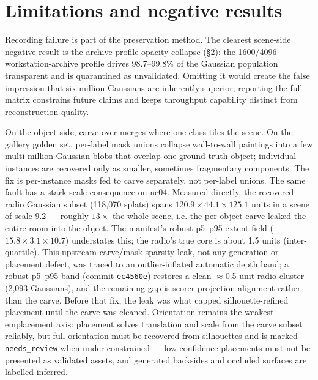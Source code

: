 \section{Limitations and negative results}

Recording failure is part of the preservation method. The clearest scene-side negative result is the
archive-profile opacity collapse (\S2): the 1600/4096 workstation-archive profile drives 98.7--99.8\%
of the Gaussian population transparent and is quarantined as unvalidated. Omitting it would create the
false impression that six million Gaussians are inherently superior; reporting the full matrix
constrains future claims and keeps throughput capability distinct from reconstruction quality.

On the object side, carve over-merges where one class tiles the scene. On the gallery golden set,
per-label mask unions collapse wall-to-wall paintings into a few multi-million-Gaussian blobs that
overlap one ground-truth object; individual instances are recovered only as smaller, sometimes
fragmentary components. The fix is per-instance masks fed to carve separately, not per-label unions. %
 The same fault has a stark scale consequence on nc04. Measured directly, the recovered radio
Gaussian subset (118{,}070 splats) spans $120.9\times44.1\times125.1$ units in a scene of scale 9.2
--- roughly $13\times$ the whole scene, i.e. the per-object carve leaked the entire room into the
object. The manifest's robust p5--p95 extent field ($15.8\times3.1\times10.7$) understates this; the
radio's true core is about 1.5 units (inter-quartile). This upstream carve/mask-sparsity leak, not
any generation or placement defect, was traced to an outlier-inflated automatic depth band; a
robust p5--p95 band (commit \texttt{ec4560e}) restores a clean $\approx$0.5-unit radio cluster
(2{,}093 Gaussians), and the remaining gap is scorer projection alignment rather than the carve.
Before that fix, the leak was what capped silhouette-refined placement until the carve was
cleaned.
Orientation remains the weakest emplacement axis: placement solves translation and scale from the
carve subset reliably, but full orientation must be recovered from silhouettes and is marked
\texttt{needs\_review} when under-constrained --- low-confidence placements must not be presented as
validated assets, and generated backsides and occluded surfaces are labelled inferred.

